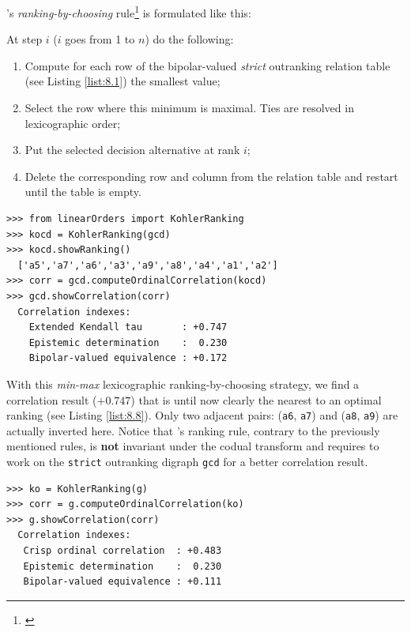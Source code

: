 \Kohler 's \emph{ranking-by-choosing} rule\footnote{\citep{KOH-1978}} is formulated like this:
\begin{definition}\label{def:kohler}
  
\noindent At step $i$ ($i$ goes from 1 to $n$) do the following:
\begin{enumerate}[leftmargin=0.5cm,rightmargin=0.5cm]
\item Compute for each row of the bipolar-valued \emph{strict} outranking relation table (see Listing \ref{list:8.1}) the smallest value;
\item Select the row where this minimum is maximal. Ties are resolved in lexicographic order;
\item Put the selected decision alternative at rank $i$;
\item Delete the corresponding row and column from the relation table and restart until the table is empty.
\end{enumerate}
\end{definition}
\begin{lstlisting}[caption={Computing a \Kohler ranking},label=list:8.13]   
>>> from linearOrders import KohlerRanking
>>> kocd = KohlerRanking(gcd)
>>> kocd.showRanking()
  ['a5','a7','a6','a3','a9','a8','a4','a1','a2']
>>> corr = gcd.computeOrdinalCorrelation(kocd)
>>> gcd.showCorrelation(corr)
  Correlation indexes:
    Extended Kendall tau       : +0.747
    Epistemic determination    :  0.230
    Bipolar-valued equivalence : +0.172
\end{lstlisting}

With this \emph{min-max} lexicographic ranking-by-choosing strategy, we find a correlation result ($+0.747$) that is until now clearly the nearest to an optimal \Kemeny ranking (see Listing \ref{list:8.8}). Only two adjacent pairs: (\texttt{a6}, \texttt{a7}) and (\texttt{a8}, \texttt{a9}) are actually inverted here. Notice that \Kohler 's ranking rule, contrary to the previously mentioned rules, is \textbf{not} invariant under the codual transform and requires to work on the \texttt{strict} outranking digraph \texttt{gcd} for a better correlation result.
\begin{lstlisting}
>>> ko = KohlerRanking(g)  
>>> corr = g.computeOrdinalCorrelation(ko)
>>> g.showCorrelation(corr)
  Correlation indexes:
   Crisp ordinal correlation  : +0.483
   Epistemic determination    :  0.230
   Bipolar-valued equivalence : +0.111
\end{lstlisting}

